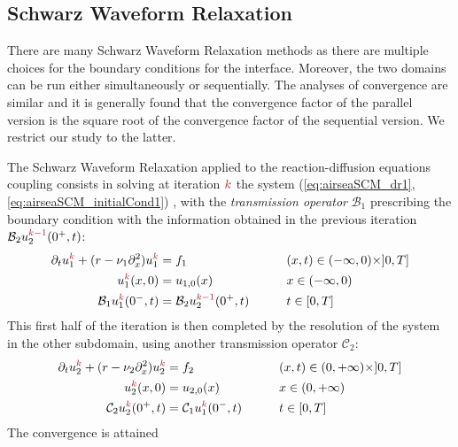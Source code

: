\subsection{Schwarz Waveform Relaxation}
There are many Schwarz Waveform Relaxation methods
as there are multiple choices for the
boundary conditions for the interface. Moreover,
the two domains can be run either simultaneously or
sequentially. The analyses of convergence are similar and it
is generally found that the convergence factor of the parallel
version is the square root of the convergence factor
of the sequential version. We restrict our study to the latter.
\par
The Schwarz Waveform Relaxation applied to
the reaction-diffusion equations coupling consists in solving
at iteration ${\emphase{k}}$ the system
(\ref{eq:airseaSCM_dr1}, \ref{eq:airseaSCM_initialCond1})
, with the \textit{transmission operator}
${\mathcal B}_1$ prescribing the boundary condition
with the information obtained in the
previous iteration ${\mathcal B}_2 u_2^{\emphase{k-1}}(0^+,t)$:
\begin{subequations}
\begin{align}
	\partial_t u^{{\emphase{k}}}_1 +( r - \nu_1 \partial_x^2) u^{\emphase{k}}_1 &= f_1  &\qquad& (x,t) \in (-\infty,0) \times ]0,T]  \\
	u_1^{\emphase{k}}(x,0) &= u_{1,0}(x)   &\qquad&  x \in (-\infty,0)  \\
	{\mathcal B}_1 u_1^{\emphase{k}}(0^-,t) &= {\mathcal B}_2 u_2^{\emphase{k-1}}(0^+,t) &\qquad& t \in [0,T] 
\end{align}
\label{eq:airseaSCM_SWR-for-u1}
\end{subequations}
This first half of the iteration is then completed by the resolution
of the system in the other subdomain, using another
transmission operator ${\mathcal C}_2$:
\begin{subequations}
\begin{align}
	\partial_t u^{\emphase{k}}_2 + ( r - \nu_2 \partial_x^2) u^{\emphase{k}}_2  &= f_2  &\qquad& (x,t) \in (0,+\infty) \times ]0,T] \\
	u^{\emphase{k}}_2(x,0) &= u_{2,0}(x)   &\qquad&  x \in (0,+\infty) \\
	{\mathcal C}_2 u_2^{\emphase{k}}(0^+,t) &= {\mathcal C}_1 u_1^{{\emphase{k}}}(0^-,t) &\qquad& t \in [0,T] \label{eq:airseaSCM_SWR-for-u2-interface}
\end{align}
\label{eq:airseaSCM_SWR-for-u2}
\end{subequations}
The convergence is attained
